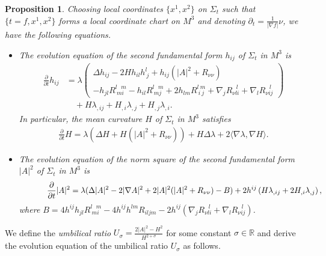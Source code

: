 \documentclass[12pt,a4paper]{amsart}
\newtheorem{Prop}{Proposition}
\begin{document}
\begin{Prop} \label{evoh}
Choosing local coordinates $\{x^1,x^2\}$ on $\Sigma_t$ such that
$\{t=f, x^1, x^2\}$ forms a local coordinate chart on $M^3$ and denoting $\partial_t=\frac1{|\nabla f|}\nu$,
we have the following equations.
\begin{itemize}
\item[\rm(a)] The evolution equation of the second fundamental form $h_{ij}$ of $\Sigma_t$ in $M^3$ is
\begin{align*}
\frac{\partial}{\partial t} h_{ij}
&=\lambda\left(
\begin{array}{l}
\Delta h_{ij}-2Hh_{il}h^l_{\ j}+ h_{ij}(|A|^2+R_{\nu\nu}) \\[2mm]
-h_{jl}R^{l\ \ \ m}_{\ mi}-h_{il}R^{l\ \ \ m}_{\ mj}+2h_{lm}R^{l\ m}_{\ i\ j}+\nabla_j R_{\nu li}^{\ \ \ l}+\nabla_l R^{\ \ \ l}_{\nu ij}
\end{array}\right) \\
&\quad+H\lambda_{,ij}+H_{,i}\lambda_{,j}+H_{,j}\lambda_{,i}.
\end{align*}
In particular, the mean curvature $H$ of $\Sigma_t$ in $M^3$ satisfies
\begin{align*}
\frac{\partial}{\partial t}H=\lambda\left(\Delta H+H(|A|^2+R_{\nu\nu})\right)+H\Delta\lambda+2\langle\nabla\lambda,\nabla H\rangle.
\end{align*}
\item[\rm(b)] The evolution equation of the norm square of the second fundamental form $|A|^2$ of $\Sigma_t$ in $M^3$ is
\begin{align*}
\hspace*{12mm}\frac{\partial}{\partial t}|A|^2
=\lambda(\Delta |A|^2-2|\nabla A|^2+2|A|^2(|A|^2+R_{\nu\nu})-B)+2h^{ij}\left( H\lambda_{,ij}+2H_{,i}\lambda_{,j}\right),
\end{align*}
where $B=4h^{ij}h_{jl}R_{\ mi\ }^{l\ \ \ m} - 4 h^{ij}h^{lm}R_{iljm}-2h^{ij}(\nabla_j R_{\nu li}^{\ \ \ l}+\nabla_l R_{\nu ij}^{\ \ \ l})$.
\end{itemize}
\end{Prop}
We define the {\it umbilical ratio} $U_\sigma=\frac{2|A|^2-H^2}{H^{2+\sigma}}$ for some constant $\sigma\in\mathbb{R}$
and derive the evolution equation of the umbilical ratio $U_\sigma$ as follows.
\end{document}
